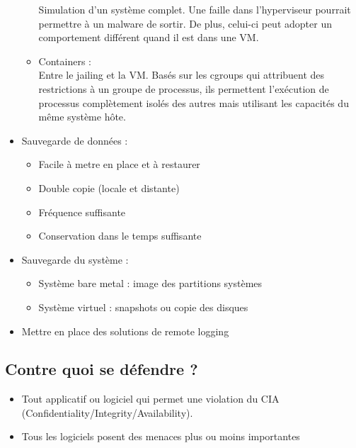 \documentclass[a4paper]{article}
\begin{document}
\begin{itemize}[label = \textbullet, font = \Large]
\begin{itemize}
        Simulation d'un système complet. Une faille dans l'hyperviseur pourrait permettre à un malware de sortir. De plus, celui-ci peut adopter un comportement différent quand il est dans une VM.
        \item Containers :\\
        Entre le jailing et la VM. Basés sur les cgroups qui attribuent des restrictions à un groupe de processus, ils permettent l’exécution de processus complètement isolés des autres mais utilisant les capacités du même système hôte.
    \end{itemize}
    \item Sauvegarde de données : \\
    \begin{itemize}
        \item Facile à metre en place et à restaurer
        \item Double copie (locale et distante)
        \item Fréquence suffisante
        \item Conservation dans le temps suffisante
    \end{itemize}
    \item Sauvegarde du système : \\
    \begin{itemize}
        \item Système bare metal : image des partitions systèmes
        \item Système virtuel : snapshots ou copie des disques
    \end{itemize}
    \item Mettre en place des solutions de remote logging
\end{itemize}

\subsection{Contre quoi se défendre ?}
\begin{itemize}[label = \textbullet, font = \Large]
    \item Tout applicatif ou logiciel qui permet une violation du CIA (Confidentiality/Integrity/Availability). 
    \item Tous les logiciels posent des menaces plus ou moins importantes
\end{itemize}
\end{document}
